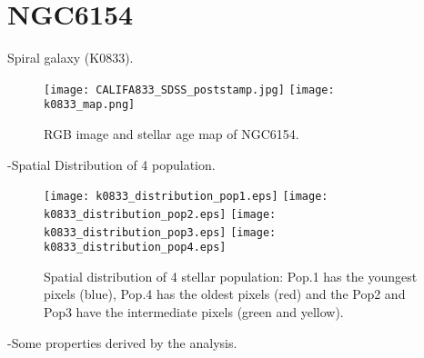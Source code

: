 \newpage
\section*{NGC6154}
Spiral galaxy (K0833).

\begin{figure}[bh]
\begin{center}
\texttt{[image: CALIFA833\_SDSS\_poststamp.jpg]}
\texttt{[image: k0833\_map.png]}
\caption{RGB image and stellar age map of NGC6154.}
   \label{fig1}
\end{center}
\end{figure}

-Spatial Distribution of 4 population.


\begin{figure}[bh]
\begin{center}
\texttt{[image: k0833\_distribution\_pop1.eps]}
\texttt{[image: k0833\_distribution\_pop2.eps]}
\texttt{[image: k0833\_distribution\_pop3.eps]}
\texttt{[image: k0833\_distribution\_pop4.eps]}
 \caption{Spatial distribution of 4 stellar population: Pop.1 has the youngest pixels (blue), Pop.4 has the oldest pixels (red) and the Pop2 and Pop3 have the intermediate pixels (green and yellow).}
   \label{fig1}
\end{center}
\end{figure}


-Some properties derived by the analysis.


